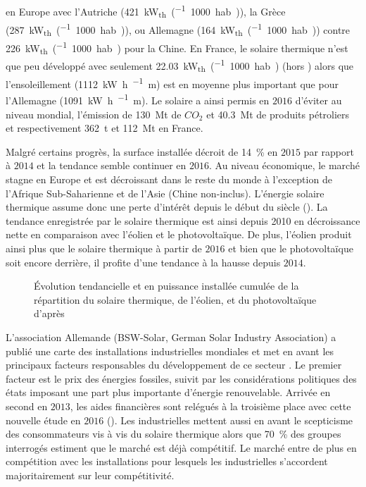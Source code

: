 en Europe avec l’Autriche (\SI{421}{\kilo\watt_{th}\per(1000 hab.)}), la Grèce
(\SI{287}{\kilo\watt_{th}\per(1000 hab.)}), ou Allemagne
(\SI{164}{\kilo\watt_{th}\per(1000 hab.)}) contre \SI{226}{\kilo\watt_{th}\per(1000 hab.)}
pour la Chine. En France, le solaire thermique n’est que peu développé avec seulement
\SI{22.03}{\kilo\watt_{th}\per(1000 hab.)} (hors ) alors que l’ensoleillement
(\SI{1112}{\kilo\watt\hour\per\squared\metre}) est en moyenne plus important que
pour l’Allemagne (\SI{1091}{\kilo\watt\hour\per\squared\metre}).
Le solaire a ainsi permis en $2016$ d’éviter au niveau mondial, l’émission de
\SI{130}{\mega\tonne} de $CO_{2}$ et \SI{40.3}{\mega\tonne} de produits pétroliers et
respectivement \SI{362}{\tonne} et \SI{112}{\mega\tonne} en France.

Malgré certains progrès, la surface installée décroit de \SI{14}{\percent} en
$2015$ par rapport à $2014$ et la tendance semble continuer en $2016$. Au niveau
économique, le marché stagne en Europe et est décroissant dans le reste du monde à
l’exception de l’Afrique Sub-Saharienne et de l’Asie (Chine non-inclus).
L’énergie solaire thermique assume donc une perte d’intérêt depuis le début du siècle
(). La tendance enregistrée par le solaire thermique est ainsi
depuis 2010 en décroissance nette en comparaison avec l’éolien et le photovoltaïque. De
plus, l’éolien produit ainsi plus que le solaire thermique à partir de $2016$ et bien que
le photovoltaïque soit encore derrière, il profite d’une tendance à la hausse depuis
$2014$.

\begin{figure}
    \centering
    \caption{Évolution tendancielle et en puissance installée cumulée de la répartition
             du solaire thermique, de l’éolien, et du photovoltaïque d’après
             \textcite{Weiss2017}}
    \label{fig:tendances_enr}
\end{figure}
\href{http://www.sunwindenergy.com/content/solar-process-heat-surprisingly-popular}{}
L’association Allemande (\textsf{BSW-Solar}, German Solar Industry Association)
a publié une carte des installations industrielles mondiales et met en avant les
principaux facteurs responsables du développement de ce secteur \parencite{Augsten2017}.
Le premier facteur est le prix des énergies fossiles, suivit par les considérations
politiques des états imposant une part plus importante d’énergie renouvelable. Arrivée
en second en $2013$, les aides financières sont relégués à la troisième place avec
cette nouvelle étude en $2016$ (). Les industrielles
mettent aussi en avant le scepticisme des consommateurs vis à vis du solaire thermique
alors que \SI{70}{\percent} des groupes interrogés estiment que le marché est déjà
compétitif. Le marché entre de plus en compétition avec les installations  pour
lesquels les industrielles s’accordent majoritairement sur leur compétitivité.

